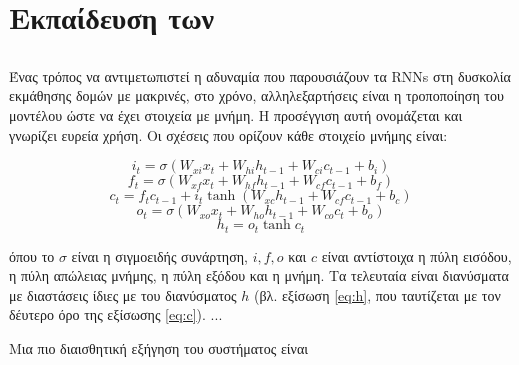 \section{Εκπαίδευση των }
\subsection{\cite{Hochreiter1997}}

Ένας τρόπος να αντιμετωπιστεί η αδυναμία που παρουσιάζουν τα RNNs στη δυσκολία εκμάθησης δομών με μακρινές, στο χρόνο, αλληλεξαρτήσεις είναι η τροποποίηση του μοντέλου ώστε να έχει στοιχεία με μνήμη.
Η προσέγγιση αυτή ονομάζεται  και γνωρίζει ευρεία χρήση. Οι σχέσεις που ορίζουν κάθε στοιχείο μνήμης είναι:

\begin{equation}
i_t = \sigma{(W_{xi}x_t + W_{hi}h_{t-1} + W_{ci}c_{t-1} + b_i)}
\end{equation}
\begin{equation}
f_t = \sigma{(W_{xf}x_t + W_{hf}h_{t-1} + W_{cf}c_{t-1} + b_f)}
\end{equation}
\begin{equation}
c_t = f_t c_{t-1} + i_t \tanh{(W_{xc} h_{t-1} + W_{cf} c_{t-1} + b_c)}\label{eq:c}
\end{equation}
\begin{equation}
o_t = \sigma(W_{xo}x_t + W_{ho} h_{t-1} + W_{co} c_t + b_o)
\end{equation}
\begin{equation}
h_t = o_t\tanh{c_t}
\end{equation}

όπου το $\sigma$ είναι η σιγμοειδής συνάρτηση, $i, f, o$ και $c$ είναι αντίστοιχα η πύλη εισόδου, η πύλη απώλειας μνήμης, η πύλη εξόδου και η μνήμη.
Τα τελευταία είναι διανύσματα με διαστάσεις ίδιες με του διανύσματος $h$ (βλ. εξίσωση \ref{eq:h}, που ταυτίζεται με τον δέυτερο όρο της εξίσωσης \ref{eq:c}). 
...

Μια πιο διαισθητική εξήγηση του συστήματος  είναι
